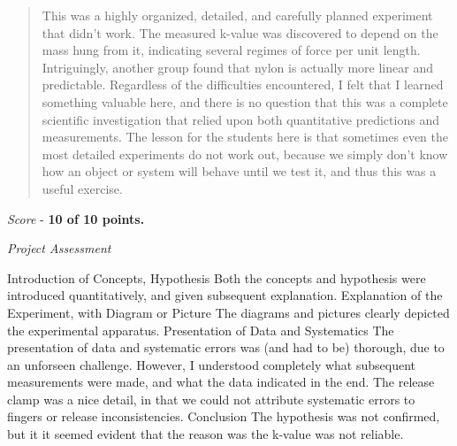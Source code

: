 \documentclass[10pt]{article}
\begin{document}
\maketitle

\begin{abstract}
This was a highly organized, detailed, and carefully planned experiment that didn't work.  The measured k-value was discovered to depend on the mass hung from it, indicating several regimes of force per unit length.  Intriguingly, another group found that nylon is actually more linear and predictable.  Regardless of the difficulties encountered, I felt that I learned something valuable here, and there is no question that this was a complete scientific investigation that relied upon both quantitative predictions and measurements.  The lesson for the students here is that sometimes even the most detailed experiments do not work out, because we simply don't know how an object or system will behave until we test it, and thus this was a useful exercise.
\end{abstract}

\textit{Score} - \textbf{10 of 10 points.}

\textit{Project Assessment}
\begin{outline}[enumerate]
\1 Introduction of Concepts, Hypothesis
\2 Both the concepts and hypothesis were introduced quantitatively, and given subsequent explanation.
\1 Explanation of the Experiment, with Diagram or Picture
\2 The diagrams and pictures clearly depicted the experimental apparatus.
\1 Presentation of Data and Systematics
\2 The presentation of data and systematic errors was (and had to be) thorough, due to an unforseen challenge.  However, I understood completely what subsequent measurements were made, and what the data indicated in the end.  The release clamp was a nice detail, in that we could not attribute systematic errors to fingers or release inconsistencies.
\1 Conclusion
\2 The hypothesis was not confirmed, but it it seemed evident that the reason was the k-value was not reliable.
\end{outline}
\end{document}
